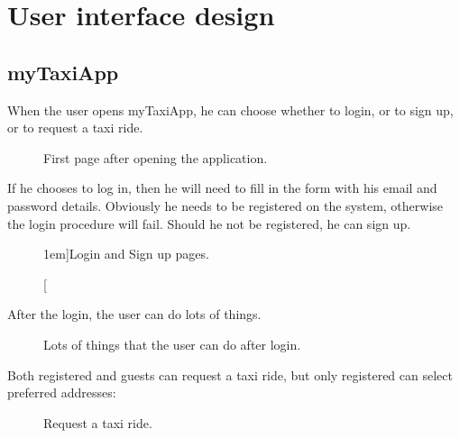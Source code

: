 \chapter{User interface design} \label{chap:userinterface}


\lipsum[2] %


\section{myTaxiApp}
When the user opens myTaxiApp, he can choose whether to login, or to sign up, or to request a taxi ride.

\begin{figure}
	\centering
	\caption{First page after opening the application.}
	\label{fig:firstPage}
\end{figure}

\newpage %

If he chooses to log in, then he will need to fill in the form with his email and password details. Obviously he needs to be registered on the system, otherwise the login procedure will fail. Should he not be registered, he can sign up.

\begin{figure}
	\hfill
	\caption[][1em]{Login and Sign up pages.}
	\label{fig:loginSignup}
\end{figure}

\newpage %



After the login, the user can do lots of things.\begin{figure}
	\centering
	\caption{Lots of things that the user can do after login.}
	\label{fig:logged}
\end{figure}


\newpage %


Both registered and guests can request a taxi ride, but only registered can select preferred addresses:

\begin{figure}
	\centering
	\caption{Request a taxi ride.}
	\label{fig:request}
\end{figure}

